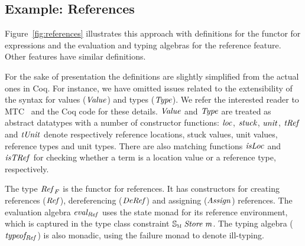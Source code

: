 


\subsection{Example: References}
Figure~\ref{fig:references} illustrates this approach with definitions for the
functor for expressions and the evaluation and typing algebras for the
reference feature. Other features have similar definitions.

For the sake of presentation the definitions are slightly simplified
from the actual ones in Coq. For instance, we have omitted issues
related to the extensibility of the syntax for values (\ensuremath{\Conid{Value}}) and
types (\ensuremath{\Conid{Type}}).  We refer the interested reader to MTC~\cite{mtc} and
the \name Coq code for these details.  \ensuremath{\Conid{Value}} and \ensuremath{\Conid{Type}} are treated
as abstract datatypes with a number of constructor functions: \ensuremath{\Varid{loc}},
\ensuremath{\Varid{stuck}}, \ensuremath{\Varid{unit}}, \ensuremath{\Varid{tRef}} and \ensuremath{\Varid{tUnit}} denote respectively reference
locations, stuck values, unit values, reference types and unit
types. There are also matching functions \ensuremath{\Varid{isLoc}} and \ensuremath{\Varid{isTRef}} for
checking whether a term is a location value or a reference type,
respectively.

The type \ensuremath{\Varid{Ref}_F} is the functor for references. It has
constructors for creating references (\ensuremath{\Conid{Ref}}), dereferencing (\ensuremath{\Conid{DeRef}}) and
assigning (\ensuremath{\Conid{Assign}}) references. The evaluation algebra \ensuremath{\Varid{eval_{Ref}}} uses
the state monad for its reference environment, which is captured
in the type class constraint \ensuremath{\mathbb{S}_{\scalebox{0.6}{M}}\;\Conid{Store}\;\Varid{m}}.  The typing algebra
(\ensuremath{\Varid{typeof_{Ref}}}) is also monadic, using the failure monad to denote
ill-typing.


